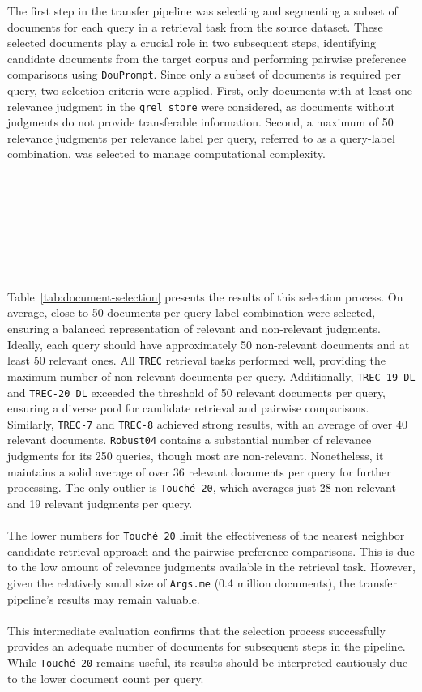 The first step in the transfer pipeline was selecting and segmenting a subset of documents for each query in a retrieval task from the source dataset. These selected documents play a crucial role in two subsequent steps, identifying candidate documents from the target corpus and performing pairwise preference comparisons using \texttt{DouPrompt}. Since only a subset of documents is required per query, two selection criteria were applied. First, only documents with at least one relevance judgment in the \texttt{qrel store} were considered, as documents without judgments do not provide transferable information. Second, a maximum of 50 relevance judgments per relevance label per query, referred to as a query-label combination, was selected to manage computational complexity.
\\\\\\\\\\\\\\\\\\
Table~\ref{tab:document-selection} presents the results of this selection process. On average, close to 50 documents per query-label combination were selected, ensuring a balanced representation of relevant and non-relevant judgments. Ideally, each query should have approximately 50 non-relevant documents and at least 50 relevant ones. All \texttt{TREC} retrieval tasks performed well, providing the maximum number of non-relevant documents per query. Additionally, \texttt{TREC-19 DL} and \texttt{TREC-20 DL} exceeded the \mbox{threshold} of 50 relevant documents per query, ensuring a diverse pool for candidate retrieval and pairwise comparisons. Similarly, \texttt{TREC-7} and \texttt{TREC-8} achieved strong results, with an average of over 40 relevant documents. \texttt{Robust04} contains a substantial number of relevance judgments for its 250 queries, though most are non-relevant. Nonetheless, it maintains a solid average of over 36 relevant documents per query for further processing. The only outlier is \texttt{Touché 20}, which averages just 28 non-relevant and 19 relevant judgments per query.
\\\\
The lower numbers for \texttt{Touché 20} limit the effectiveness of the nearest neighbor candidate retrieval approach and the pairwise preference comparisons. This is due to the low amount of relevance judgments available in the retrieval task. However, given the relatively small size of \texttt{Args.me} (0.4 million documents), the transfer pipeline's results may remain valuable.
\\\\
This intermediate evaluation confirms that the selection process successfully provides an adequate number of documents for subsequent steps in the pipeline. While \texttt{Touché 20} remains useful, its results should be interpreted cautiously due to the lower document count per query.

